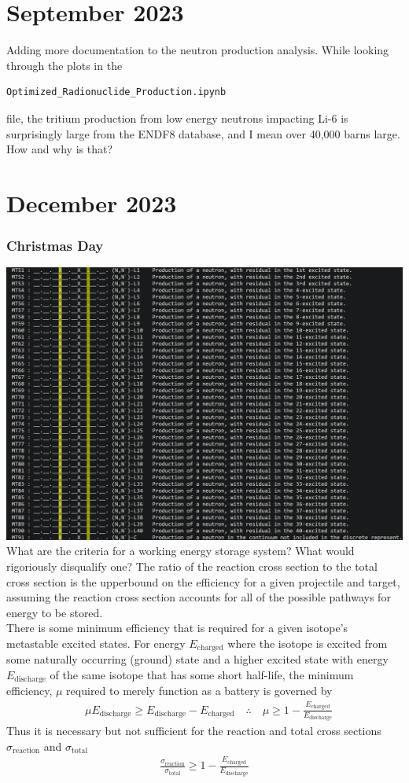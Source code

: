 \documentclass[12pt]{article}
\begin{document}
\section{September 2023}
Adding more documentation to the neutron production analysis. While looking through the plots in the 
\begin{lstlisting}
Optimized_Radionuclide_Production.ipynb
\end{lstlisting}
file, the tritium production from low energy neutrons impacting Li-6 is surprisingly large from the ENDF8 database, and I mean over 40,000 barns large. How and why is that? 

\section{December 2023}
\subsubsection{Christmas Day}
\includegraphics[scale=.7]{Images/excitation_mt_codes_endf_data_explorer.png}\\
What are the criteria for a working energy storage system? What would rigoriously disqualify one? The ratio of the reaction cross section to the total cross section is the upperbound on the efficiency for a given projectile and target, assuming the reaction cross section accounts for all of the possible pathways for energy to be stored.  \\
There is some minimum efficiency that is required for a given isotope's metastable excited states. For energy $E_\text{charged}$ where the isotope is excited from some naturally occurring (ground) state and a higher excited state with energy $E_\text{discharge}$ of the same isotope that has some short half-life, the minimum efficiency, $\mu$ required to merely function as a battery is governed by
\begin{align}
& \mu E_\text{discharge}\ge E_\text{discharge}-E_\text{charged}
\quad\therefore\quad \mu\ge1-\frac{E_\text{charged}}{E_\text{discharge}} 
\end{align}
Thus it is necessary but not sufficient for the reaction and total cross sections $\sigma_\text{reaction}$ and $\sigma_\text{total}$
\begin{align}
\frac{\sigma_\text{reaction}}{\sigma_\text{total}}\ge1-\frac{E_\text{charged}}{E_\text{discharge}} 
\end{align}
\end{document}
